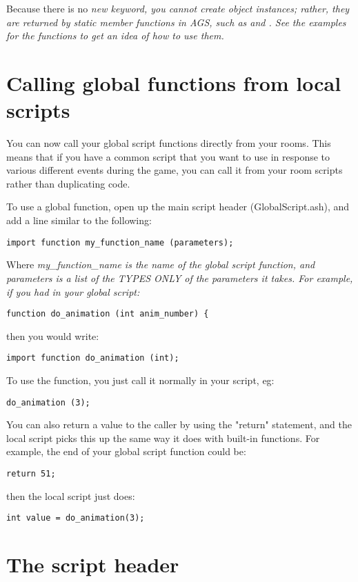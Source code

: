Because there is no \it{new} keyword, you cannot create object instances; rather, they
are returned by static member functions in AGS, such as 
and . See the examples for the
functions to get an idea of how to use them.


\section{Calling global functions from local scripts}%

You can now call your global script functions directly from your rooms. This
means that if you have a common script that you want to use in response to
various different events during the game, you can call it from your room
scripts rather than duplicating code.

To use a global function, open up the main script header (GlobalScript.ash),
and add a line similar to the following:
\begin{verbatim}
import function my_function_name (parameters);
\end{verbatim}
Where \it{my_function_name} is the name of the global script function, and
\it{parameters} is a list of the TYPES ONLY of the parameters it takes. For example,
if you had in your global script:
\begin{verbatim}
function do_animation (int anim_number) {
\end{verbatim}
then you would write:
\begin{verbatim}
import function do_animation (int);
\end{verbatim}
To use the function, you just call it normally in your script, eg:
\begin{verbatim}
do_animation (3);
\end{verbatim}
You can also return a value to the caller by using the "return" statement,
and the local script picks this up the same way it does with built-in
functions. For example, the end of your global script function could be:
\begin{verbatim}
return 51;
\end{verbatim}
then the local script just does:
\begin{verbatim}
int value = do_animation(3);
\end{verbatim}

\section{The script header}%

